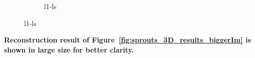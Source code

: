 \documentclass{article}
\begin{document}
\begin{figure}[!h]
    \begin{subfigure}[b]{\linewidth}
\captionsetup{labelformat=empty}
        \caption{\large{l1-ls}}
     \end{subfigure}
\end{figure}
\newpage
\textbf{Reconstruction result of Figure~\ref{fig:sprouts_3D_results_biggerIm}  is shown in large size for better clarity.}\\
\end{document}
